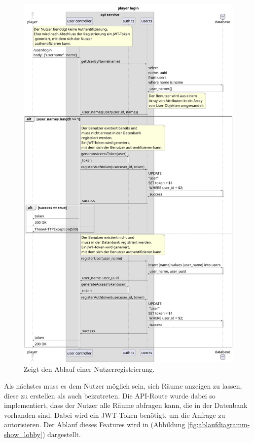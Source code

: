 \documentclass[
]{article}
\begin{document}
\begin{figure}[H]
  \centering
  \includegraphics[width=\textwidth ]{resources/login.pdf}
  \caption{Zeigt den Ablauf einer Nutzerregistrierung.}
  \label{fig:ablaufdiagramm-login}
\end{figure}

Als nächstes muss es dem Nutzer möglich sein, sich Räume anzeigen zu lassen, diese zu erstellen als auch beizutreten.
Die API-Route wurde dabei so implementiert, dass der Nutzer alle Räume abfragen kann, die in der Datenbank vorhanden sind.
Dabei wird ein JWT-Token benötigt, um die Anfrage zu autorisieren. Der Ablauf dieses Features wird in (Abbildung \ref{fig:ablaufdiagramm-show_lobby}) dargestellt.
\end{document}
